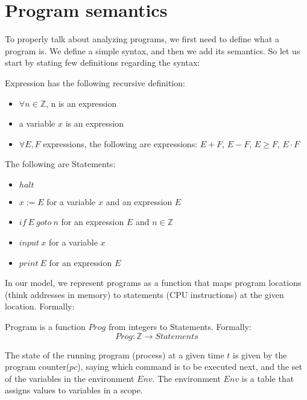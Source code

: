 \section{Program semantics}

To properly talk about analyzing programs, we first need to define what a program is.
We define a simple syntax, and then we add its semantics.
So let us start by stating few definitions regarding the syntax:

\begin{defn}[Expression]
    Expression has the following recursive definition:
    \begin{itemize}
        \item $\forall n \in \mathbb{Z}$, n is an expression
        \item a variable $x$ is an expression
        \item $\forall E, F$ expressions, the following are expressions: $E+F$, $E-F$, $E \geq F$, $E \cdot F$
    \end{itemize}
\end{defn}

\begin{defn}[Statement]
    The following are Statements:
    \begin{itemize}
        \item $halt$
        \item $x := E$ for a variable $x$ and an expression $E$
        \item $if \: E \: goto \: n$ for an expression $E$ and $n \in \mathbb{Z}$
        \item $input \: x$ for a variable $x$
        \item $print \: E$ for an expression $E$
    \end{itemize}
\end{defn}

In our model, we represent programs as a function that maps program locations (think addresses in memory) to statements
(CPU instructions) at the given location.
Formally:

\begin{defn}[Program]
    Program is a function $Prog$ from integers to Statements.
    Formally:
    \[Prog: \mathbb{Z} \rightarrow Statements\]
\end{defn}

The state of the running program (process) at a given time $t$ is given by the program counter($pc$), saying which
command is to be executed next, and the set of the variables in the environment $Env$.
The environment $Env$ is a table that assigns values to variables in a scope.

